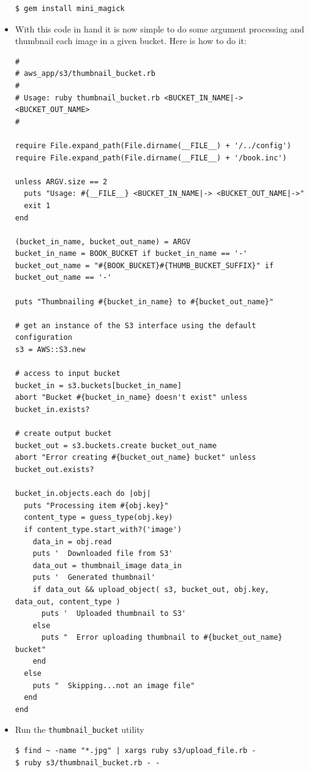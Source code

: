 \documentclass{beamer}
\begin{document}
\begin{frame}
\begin{itemize}
\lstset{language=shell}
\begin{lstlisting}[escapechar=!]
$ gem install mini_magick
\end{lstlisting}


\item With this code in hand it is now simple to do some argument processing
and thumbnail each image in a given bucket. Here is how to do it:
\lstset{language=Ruby, style=eclipse}
\begin{lstlisting}[escapechar=!]
#
# aws_app/s3/thumbnail_bucket.rb
#
# Usage: ruby thumbnail_bucket.rb <BUCKET_IN_NAME|-> <BUCKET_OUT_NAME>
#

require File.expand_path(File.dirname(__FILE__) + '/../config')
require File.expand_path(File.dirname(__FILE__) + '/book.inc')

unless ARGV.size == 2
  puts "Usage: #{__FILE__} <BUCKET_IN_NAME|-> <BUCKET_OUT_NAME|->"
  exit 1
end

(bucket_in_name, bucket_out_name) = ARGV
bucket_in_name = BOOK_BUCKET if bucket_in_name == '-'
bucket_out_name = "#{BOOK_BUCKET}#{THUMB_BUCKET_SUFFIX}" if bucket_out_name == '-'

puts "Thumbnailing #{bucket_in_name} to #{bucket_out_name}"

# get an instance of the S3 interface using the default configuration
s3 = AWS::S3.new

# access to input bucket
bucket_in = s3.buckets[bucket_in_name]
abort "Bucket #{bucket_in_name} doesn't exist" unless bucket_in.exists?

# create output bucket
bucket_out = s3.buckets.create bucket_out_name
abort "Error creating #{bucket_out_name} bucket" unless bucket_out.exists?

bucket_in.objects.each do |obj|
  puts "Processing item #{obj.key}"
  content_type = guess_type(obj.key)
  if content_type.start_with?('image')
    data_in = obj.read
    puts '  Downloaded file from S3'
    data_out = thumbnail_image data_in
    puts '  Generated thumbnail'
    if data_out && upload_object( s3, bucket_out, obj.key, data_out, content_type )
      puts '  Uploaded thumbnail to S3'
    else
      puts "  Error uploading thumbnail to #{bucket_out_name} bucket"
    end
  else
    puts "  Skipping...not an image file"
  end
end
\end{lstlisting}

\item Run the \texttt{thumbnail\_bucket} utility
\lstset{language=shell}
\begin{lstlisting}[escapechar=!]
$ find ~ -name "*.jpg" | xargs ruby s3/upload_file.rb -
$ ruby s3/thumbnail_bucket.rb - -
\end{lstlisting}

\end{itemize}
\end{frame}
\end{document}
